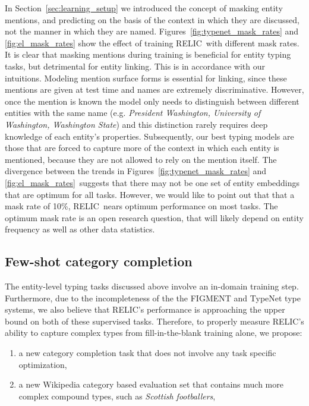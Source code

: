 \documentclass{article} \usepackage{iclr2020_conference,times}
\newcommand{\ack}{RELIC\xspace}
\begin{document}
In Section~\ref{sec:learning_setup} we introduced the concept of masking entity mentions, and predicting on the basis of the context in which they are discussed, not the manner in which they are named. 
Figures~\ref{fig:typenet_mask_rates} and \ref{fig:el_mask_rates} show the effect of training \ack~with different mask rates. 
It is clear that masking mentions during training is beneficial for entity typing tasks, but detrimental for entity linking. 
This is in accordance with our intuitions. Modeling mention surface forms is essential for linking, since these mentions are given at test time and names are extremely discriminative. However, once the mention is known the model only needs to distinguish between different entities with the same name (e.g. {\it President Washington, University of Washington, Washington State}) and this distinction rarely requires deep knowledge of each entity's properties. Subsequently, our best typing models are those that are forced to capture more of the context in which each entity is mentioned, because they are not allowed to rely on the mention itself.
The divergence between the trends in Figures~\ref{fig:typenet_mask_rates} and \ref{fig:el_mask_rates}~suggests that there may not be one set of entity embeddings that are optimum for all tasks. However, we would like to point out that that a mask rate of 10\%, \ack~nears optimum performance on most tasks. The optimum mask rate is an open research question, that will likely depend on entity frequency as well as other data statistics.


\subsection{Few-shot category completion} \label{sec:category_completion}
The entity-level typing tasks discussed above involve an in-domain training step. 
Furthermore, due to the incompleteness of the the FIGMENT and TypeNet type systems, we also believe that \ack's performance is approaching the upper bound on both of these supervised tasks.
Therefore, to properly measure \ack's ability to capture complex types from fill-in-the-blank training alone, we propose:

\begin{enumerate}
\item a new category completion task that does not involve any task specific optimization,
\item a new Wikipedia category based evaluation set that contains much more complex compound types, such as {\it Scottish footballers},
\end{enumerate}
\end{document}
